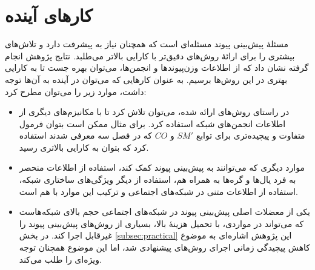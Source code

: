 \section{کارهای آینده}

مسئله‌ٔ پیش‌بینی پیوند مسئله‌ای است که همچنان نیاز به پیشرفت دارد و تلاش‌های بیشتری را برای ارائهٔ روش‌های دقیق‌تر با کارایی بالاتر می‌طلبد. نتایج پژوهش انجام گرفته نشان داد که از اطلاعات وزن‌پیوندها و انجمن‌ها، می‌توان بهره جست تا به کارایی بهتری در این روش‌ها برسیم. به عنوان کارهایی که می‌توان در آینده به آن‌ها توجه داشت، موارد زیر را می‌توان مطرح کرد:

\begin{itemize}
  \item در راستای روش‌های ارائه شده، می‌توان تلاش کرد تا با مکانیزم‌های دیگری از اطلاعات انجمن‌های شبکه استفاده کرد. برای مثال ممکن است بتوان فرمول متفاوت و پیچیده‌تری برای توابع $SM'$ و $CO$ که در فصل سه معرفی شدند استفاده کرد که بتوان به کارایی بالاتری رسید.
  \item موارد دیگری که می‌توانند به پیش‌بینی پیوند کمک کند، استفاده از اطلاعات منحصر به فرد یال‌ها و گره‌ها به همراه هم، استفاده از دیگر ویژگی‌های ساختاری شبکه، استفاده از اطلاعات متنی در شبکه‌های اجتماعی و ترکیب این موارد با هم است.
  \item یکی از معضلات اصلی پیش‌بینی پیوند در شبکه‌های اجتماعی حجم بالای شبکه‌هاست که می‌تواند در مواردی، با تحمیل هزینهٔ بالا، بسیاری از روش‌های پیش‌بینی پیوند را غیرقابل اجرا کند. در بخش \ref{subsec:practical} این پژوهش اشاره‌ای به موضوع کاهش پیچیدگی زمانی اجرای روش‌های پیشنهادی شد، اما این موضوع همچنان توجه ویژه‌ای را طلب می‌کند.
\end{itemize}
